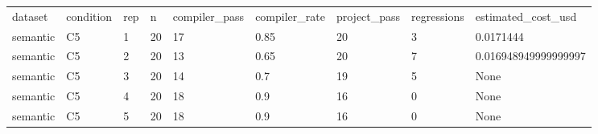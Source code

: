 \begin{tabular}{lllllllll}
dataset & condition & rep & n & compiler\_pass & compiler\_rate & project\_pass & regressions & estimated\_cost\_usd \\
semantic & C5 & 1 & 20 & 17 & 0.85 & 20 & 3 & 0.0171444 \\
semantic & C5 & 2 & 20 & 13 & 0.65 & 20 & 7 & 0.016948949999999997 \\
semantic & C5 & 3 & 20 & 14 & 0.7 & 19 & 5 & None \\
semantic & C5 & 4 & 20 & 18 & 0.9 & 16 & 0 & None \\
semantic & C5 & 5 & 20 & 18 & 0.9 & 16 & 0 & None \\
\end{tabular}